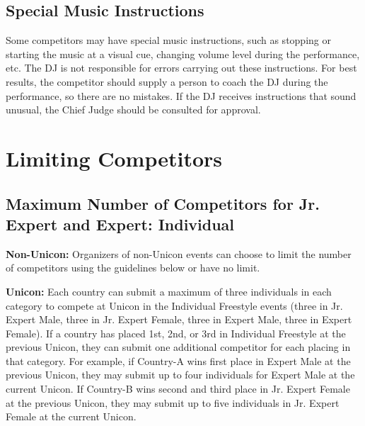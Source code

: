 \subsection{Special Music Instructions}
Some competitors may have special music instructions, such as stopping or starting the music at a visual cue, changing volume level during the performance, etc.
The DJ is not responsible for errors carrying out these instructions.
For best results, the competitor should supply a person to coach the DJ during the performance, so there are no mistakes.
If the DJ receives instructions that sound unusual, the Chief Judge should be consulted for approval.

\section{Limiting Competitors}

\subsection{Maximum Number of Competitors for Jr. Expert and Expert: Individual}
\textbf{Non-Unicon:} Organizers of non-Unicon events can choose to limit the number of competitors using the guidelines below or have no limit. %

\textbf{Unicon:} Each country can submit a maximum of three individuals in each category to compete at Unicon in the Individual Freestyle events (three in Jr. Expert Male, three in Jr. Expert Female, three in Expert Male, three in Expert Female).
If a country has placed 1st, 2nd, or 3rd in Individual Freestyle at the previous Unicon, they can submit one additional competitor for each placing in that category.
For example, if Country-A wins first place in Expert Male at the previous Unicon, they may submit up to four individuals for Expert Male at the current Unicon.
If Country-B wins second and third place in Jr. Expert Female at the previous Unicon, they may submit up to five individuals in Jr. Expert Female at the current Unicon.

